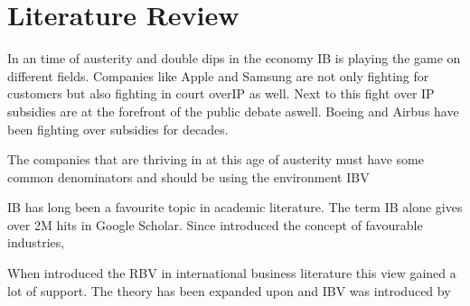 \chapter{Literature Review}


In an time of austerity and double dips in the economy \gls{IB} is playing the game on different fields. Companies like Apple and Samsung are not only fighting for customers but also fighting in court over\gls{IP} as well. Next to this fight over \gls{IP} subsidies are at the forefront of the public debate aswell. Boeing and Airbus have been fighting over subsidies for decades. 

The companies that are thriving in  at this age of austerity must have some common denominators and should be using the environment 
\Gls{IBV} 

\Gls{IB} has long been a favourite topic in academic literature. The term \gls{IB} alone gives over 2M hits in Google Scholar. Since \cite{Porter:1980} introduced the concept of favourable industries, 

When \cite{Barney:1991} introduced the \gls{RBV} in international business literature this view gained a lot of support. 
The theory has been expanded upon and \gls{IBV} was introduced by \cite{Kostova:1999,Meyer:2009,Wang:2012}